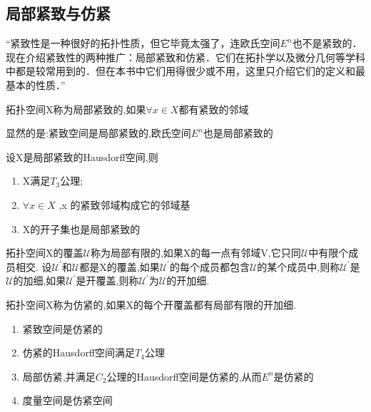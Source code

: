     \subsection*{局部紧致与仿紧}
    “紧致性是一种很好的拓扑性质，但它毕竟太强了，连欧氏空间\(E^n\)也不是紧致的．现在介绍紧致性的两种推广：局部紧致和仿紧．它们在拓扑学以及微分几何等学科中都是较常用到的．但在本书中它们用得很少或不用，这里只介绍它们的定义和最基本的性质．”
    \begin{definition}
        拓扑空间X称为局部紧致的,如果\(\forall x \in X \)都有紧致的邻域
    \end{definition}
    显然的是:紧致空间是局部紧致的,欧氏空间\(E^n\)也是局部紧致的 
    \begin{corollary}
        设X是局部紧致的Hausdorff空间,则
        \begin{enumerate}
            \item X满足\(T_3\)公理; \\
            \item \(\forall x \in X \) ,x 的紧致邻域构成它的邻域基 \\
            \item X的开子集也是局部紧致的
        \end{enumerate}
    \end{corollary}
    拓扑空间X的覆盖\(\mathscr{U}\)称为局部有限的,如果X的每一点有邻域V,它只同\(\mathscr{U}\)中有限个成员相交.
    设\(\mathscr{U}^{'}\)和\(\mathscr{U}\)都是X的覆盖,如果\(\mathscr{U}^{'}\)的每个成员都包含\(\mathscr{U}\)的某个成员中,则称\(\mathscr{U}^{'}\)是\(\mathscr{U}\)的加细,如果\(\mathscr{U}^{'}\)是开覆盖,则称\(\mathscr{U}^{'}\)为\(\mathscr{U}\)的开加细.
    \begin{definition}
        拓扑空间X称为仿紧的,如果X的每个开覆盖都有局部有限的开加细.
    \end{definition}
    \begin{theorem}
        \begin{enumerate}
            \item 紧致空间是仿紧的 \\
            \item 仿紧的Hausdorff空间满足\(T_4\)公理 \\
            \item 局部仿紧,并满足\(C_2\)公理的Hausdorff空间是仿紧的,从而\(E^n\)是仿紧的 \\
            \item 度量空间是仿紧空间 
        \end{enumerate}
    \end{theorem}
